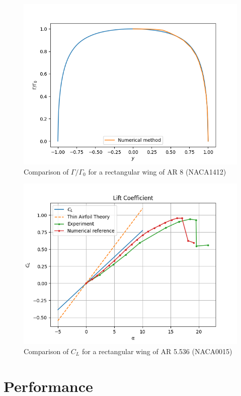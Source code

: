 \documentclass[letterpaper,12pt]{article}
\begin{document}
\begin{figure}[H]
\includegraphics[scale=0.75]{finite_gamma_1412_ar8}
\centering
\caption{Comparison of $\Gamma/\Gamma_0$ for a rectangular wing of AR 8 (NACA1412)}
\label{finite-ar8}
\end{figure}

\begin{figure}[H]
\includegraphics[scale=0.75]{finite_CL_0015}
\centering
\caption{Comparison of $C_L$ for a rectangular wing of AR 5.536 (NACA0015)}
\label{finite-cl}
\end{figure}

\pagebreak%

\section{Performance}
\end{document}
